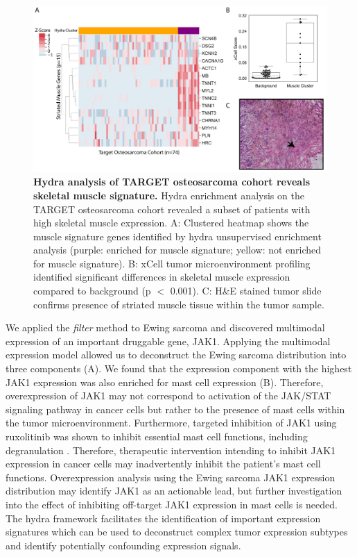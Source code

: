 \documentclass[10pt,letterpaper]{article}
\begin{document}
%
%
\begin{figure}[!h]
	\includegraphics[width=\textwidth]{img/PNG/muscle-signature-genes-2x}
	\caption{{\bf Hydra analysis of TARGET osteosarcoma cohort reveals skeletal muscle signature.}
		 Hydra enrichment analysis on the TARGET osteosarcoma cohort revealed a subset of patients with high skeletal muscle expression. A: Clustered heatmap shows the muscle signature genes identified by hydra unsupervised enrichment analysis (purple: enriched for muscle signature; yellow: not enriched for muscle signature). B: xCell tumor microenvironment profiling identified significant differences in skeletal muscle expression compared to background (p $<$ 0.001). C: H\&E stained tumor slide confirms presence of striated muscle tissue within the tumor sample.}
	\label{muscle}
\end{figure}

We applied the \textit{filter} method to Ewing sarcoma and discovered multimodal expression of an important druggable gene, JAK1. Applying the multimodal expression model allowed us to deconstruct the Ewing sarcoma distribution into three components (A). We found that the expression component with the highest JAK1 expression was also enriched for mast cell expression (B). Therefore, overexpression of JAK1 may not correspond to activation of the JAK/STAT signaling pathway in cancer cells but rather to the presence of mast cells within the tumor microenvironment. Furthermore, targeted inhibition of JAK1 using ruxolitinib was shown to inhibit essential mast cell functions, including degranulation \cite{hermansJAK1JAK2Inhibitor2018}. Therefore, therapeutic intervention intending to inhibit JAK1 expression in cancer cells may inadvertently inhibit the patient’s mast cell functions. Overexpression analysis using the Ewing sarcoma JAK1 expression distribution may identify JAK1 as an actionable lead, but further investigation into the effect of inhibiting off-target JAK1 expression in mast cells is needed. The hydra framework facilitates the identification of important expression signatures which can be used to deconstruct complex tumor expression subtypes and identify potentially confounding expression signals.
\end{document}
